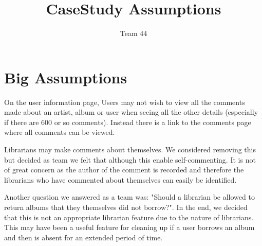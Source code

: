\documentclass{article}
\title{CaseStudy Assumptions}
\author{Team 44}
\begin{document}
\section{Big Assumptions}
On the user information page, Users may not wish to view all the comments made about an artist, album or user when seeing all the other details (especially if there are 600 or so comments). Instead there is a link to the comments page where all comments can be viewed. 

Librarians may make comments about themselves. We considered removing this but decided as team we felt that although this enable self-commenting. It is not of great concern as the author of the comment is recorded and therefore the librarians who have commented about themselves can easily be identified. 

Another question we answered as a team was: "Should a librarian be allowed to return albums that they themselves did not borrow?". In the end, we decided that this is not an appropriate librarian feature due to the nature of librarians. This may have been a useful feature for cleaning up if a user borrows an album and then is absent for an extended period of time. 
\end{document}
